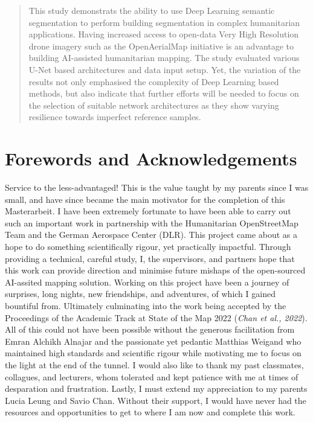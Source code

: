 \documentclass[11pt, a4paper, twoside]{report}
\begin{document}
\begin{abstract}
This study demonstrats the ability to use Deep Learning semantic segmentation to perform
building segmentation in complex humanitarian applications. Having increased access to
open-data Very High Resolution drone imagery such as the OpenAerialMap initiative is an advantage to
building AI-assisted humanitarian mapping. The study evaluated various U-Net based
architectures and data input setup. Yet, the variation of the results not only emphasised the
complexity of Deep Learning based methods, but also indicate that further efforts will be needed to
focus on the selection of suitable network architectures as they show varying resilience
towards imperfect reference samples.\\\par

\end{abstract}

\newpage

\section{Forewords and Acknowledgements}

Service to the less-advantaged! This is the value taught by my parents since I was small, and have since became the main motivator for the completion of this Masterarbeit. I have been extremely fortunate to have been able to carry out such an important work in partnership with the Humanitarian OpenStreetMap Team and the German Aerospace Center (DLR). This project came about as a hope to do something scientifically rigour, yet practically impactful. Through providing a technical, careful study, I, the supervisors, and partners hope that this work can provide direction and minimise future mishaps of the open-sourced AI-assited mapping solution. Working on this project have been a journey of surprises, long nights, new friendships, and adventures, of which I gained bountiful from. Ultimately culminating into the work being accepted by the Proceedings of the Academic Track at State of the Map 2022 (\textit{Chan et al., 2022}). All of this could not have been possible without the generous facilitation from Emran Alchikh Alnajar and the passionate yet pedantic Matthias Weigand who maintained high standards and scientific rigour while motivating me to focus on the light at the end of the tunnel. I would also like to thank my past classmates, collagues, and lecturers, whom tolerated and kept patience with me at times of desparation and frustration. Lastly, I must extend my appreciation to my parents Lucia Leung and Savio Chan. Without their support, I would have never had the resources and opportunities to get to where I am now and complete this work.
\end{document}
